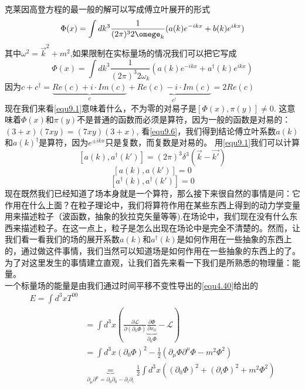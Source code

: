 克莱因高登方程的最一般的解可以写成傅立叶展开的形式
\begin{equation} \label{equ9.5}
\Phi(x)=\int dk^{3}\frac{1}{(2\pi)^{3}2\omege_{k}}(a(k)e^{-ikx}+b(k)e^{ikx})
\end{equation}
其中$\omega^{2}=\vec{k}^{2}+m^{2}$,如果限制在实标量场的情况我们可以把它写成
\begin{equation} \label{equ9.6}
\Phi(x)=\int dk^{3}\frac{1}{(2\pi)^{3}2\omega_{k}}(a(k)e^{-ikx}+a^{\dag}(k)e^{ikx})
\end{equation}
因为$c+c^{\dag}=\underbrace{Re(c)+i \cdot Im(c)}_{c}+\underbrace{Re(c)-i \cdot Im(c)}_{c^{\dag}}=2Re(c)$\\
现在我们来看\ref{equ9.1}意味着什么，不为零的对易子是$[\Phi(x),\pi(y)]\neq 0$. 这意味着$\Phi(x)$和$\pi(y)$不是普通的函数而必须是算符，因为一般的函数是对易的：$(3+x)(7xy)=(7xy)(3+x)$, 看\ref{equ9.6}，我们得到结论傅立叶系数$a(k)$和$a(k)^{\dag}$是算符，因为$e^{\pm ikx}$只是复数，而复数是对易的。
用\ref{equ9.1}我们可以计算
\begin{equation} \label{equ9.7}
[a(k),a^{\dag}(k')]=(2\pi)^{3}\delta^{3}(\vec{k}-\vec{k'})
\end{equation}
\begin{equation} \label{equ9.8}
[a(k),a(k')]=0
\end{equation}
\begin{equation} \label{equ9.9}
[a^{\dag}(k),a^{\dag}(k')]=0
\end{equation}
现在既然我们已经知道了场本身就是一个算符，那么接下来很自然的事情是问：它作用在什么上面？在粒子理论中，我们将算符作用在某些东西上得到的动力学变量用来描述粒子（波函数，抽象的狄拉克矢量等等).在场论中，我们现在没有什么东西来描述粒子。在这一点上，粒子是怎么出现在场论中是完全不清楚的。然而，让我们看一看我们的场的展开系数$a(k)$和$a^{\dag}(k)$是如何作用在一些抽象的东西上的，通过做这件事情，我们当然可以知道场是如何作用在一些抽象的东西上的了。为了对这里发生的事情建立直观，让我们首先来看一下我们是所熟悉的物理量：能量。\\
一个标量场的能量是由我们通过时间平移不变性导出的\ref{equ4.40}给出的
\begin{align} \label{equ9.10}
E=\int d^{3}x T^{00}\\&=\int d^{3}x(\frac{\partial \mathcal{L}}{\partial(\partial_{0}\Phi)}\underbrace{\frac{\partial \Phi}{\partial x_{0}}}_{\partial_{0}\Phi}-\mathcal{L})\\&=\int d^{3}x(\partial_{0}\Phi)^{2}-\frac{1}{2}(\partial_{\mu}\Phi \partial^{\mu}\Phi-m^{2}\Phi^{2})\\ &\underbrace{=}_{\partial_{\mu}\partial^{\mu}=\partial_{0} \partial_{0}-\partial_{i}\partial_{i}}\frac{1}{2}\int d^{3}x( (\partial_{0}\Phi)^{2}+(\partial_{i}\Phi)^{2}+m^{2}\Phi^{2})
\end{align}
